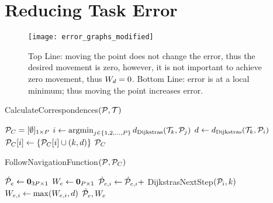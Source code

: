 
\section{Reducing Task Error}
\label{sec:reducing_error}

\begin{figure}[t]
    \centering
    \texttt{[image: error\_graphs\_modified]}
    \caption{Top Line: moving the point does not change the error, thus the desired movement is zero, however, it is not important to achieve zero movement, thus $W_d = 0$.  Bottom Line: error is at a local minimum; thus moving the point increases error.}
    \label{fig:error_examples}
\end{figure}

\begin{algorithm}[t]
\caption{CalculateCorrespondences$(\mathcal{P}, \mathcal{T})$}
\begin{algorithmic}[1]
    \State $\mathcal{P}_C = [ \emptyset ]_{1 \times P}$
        \State $i \gets \operatorname*{argmin}_{j \in \{ 1, 2, \dots, P \}} d_\textrm{Dijkstras}(\mathcal{T}_k, \mathcal{P}_j)$
        \State $d \gets d_\textrm{Dijkstras}(\mathcal{T}_k, \mathcal{P}_i)$
        \State $\mathcal{P}_C[i] \gets \{ \mathcal{P}_C[i] \cup (k, d)\}$
    \EndFor
    \State \Return $\mathcal{P}_C$
\end{algorithmic}
\label{alg:calculate_correspondences}
\end{algorithm}

\begin{algorithm}[t]
\caption{FollowNavigationFunction$(\mathcal{P}, \mathcal{P}_C)$}
\begin{algorithmic}[1]
    \State $\dot{\mathcal{P}}_e \gets \mathbf{0}_{{3P} \times 1}$
    \State $W_e \gets \mathbf{0}_{P \times 1}$
            \State $\dot{\mathcal{P}}_{e,i} \gets \dot{\mathcal{P}}_{e,i} +$ DijkstrasNextStep$(\mathcal{P}_i, k)$ \label{alg:follow_nav:accumulate}
            \State $W_{e,i} \gets \max(W_{e,i}, d)$ \label{alg:follow_nav:max}
        \EndFor
    \EndFor
    \State \Return $\dot{\mathcal{P}}_e, W_e$
\end{algorithmic}
\label{alg:follow_nav_function}
\end{algorithm}

